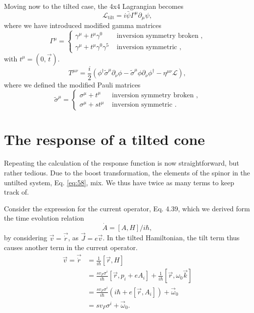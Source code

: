 Moving now to the tilted case, the 4x4 Lagrangian becomes \cite{vanderwurffMagnetovorticalThermoelectricTransport2019}
\begin{equation}
  \label{eq:31}
  \mathcal{L}_{\text{tilt}} = i \bar{\psi} \Gamma ^{\mu }\partial_{\mu } \psi ,
\end{equation}
where we have introduced modified gamma matrices
\begin{equation}
  \label{eq:107}
  \Gamma ^{\mu } =
  \begin{cases}
    \gamma ^{\mu } + t^{\mu} \gamma ^0& \text{ inversion symmetry broken },\\
    \gamma^{\mu} + t^{\mu} \gamma^0 \gamma^5 & \text{ inversion symmetric },
  \end{cases}
\end{equation}
with \( t^{\mu } = (0, \vec{t}) \).
\begin{equation}
  \label{eq:108}
  T^{\mu \nu} =
  \frac{i}{2} (
  \phi^{\dagger} \tilde{\sigma} ^{\mu} \partial_{\nu} \phi
  - \tilde{\sigma} ^{\mu} \phi \partial_{\nu} \phi^{\dagger}
  - \eta^{\mu \nu} \mathcal{L}
  ),
\end{equation}
where we defined the modified Pauli matrices
\begin{equation}
  \label{eq:109}
  \tilde{\sigma}^{\mu} =
  \begin{cases}
    \sigma^{\mu} + t^{\mu} & \text{ inversion symmetry broken },\\
    \sigma^{\mu} + s t^{\mu} & \text{ inversion symmetric }.
  \end{cases}
\end{equation}



\section{The response of a tilted cone}

Repeating the calculation of the response function is now straightforward, but rather tedious.
Due to the boost transformation, the elements of the spinor in the untilted system, Eq. \eqref{eq:58}, mix.
We thus have twice as many terms to keep track of.

Consider the expression for the current operator, Eq. 4.39, which we derived form the time evolution relation
\[
  \dot{A} = [A, H]/i\hbar,
\]
by considering \(\vec{v} = \vec\dot{r}\), as \(\vec{J} = e \vec{v}\).
In the tilted Hamiltonian, the tilt term thus causes another term in the current operator.
\begin{equation}
  \label{eq:66}
  \begin{split}
    \vec{v} = \vec\dot{r} &= \frac{1}{i \hbar } [\vec{r}, H] \\
    &= \frac{s v_{F} \sigma ^{ i}}{i \hbar } [\vec{r}, p_{i} + e A_{i}] + \frac{1}{i\hbar } [\vec{r}, \omega_{0} \vec{k}]\\
    &= \frac{s v_{F} \sigma ^{ i}}{i \hbar } (i\hbar + e[\vec{r}, A_{i}]) + \vec{\omega}_{0}\\
    &= s v_{F} \sigma ^{i} + \vec{\omega} _{0}.
  \end{split}
\end{equation}

